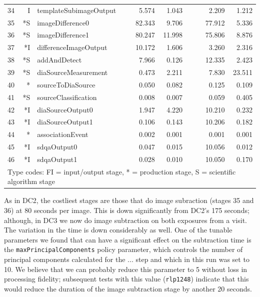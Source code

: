 \begin{table}[htbp]
\begin{center}
\begin{tabular}{lrlcrrc|crr}
34 &  I &        templateSubimageOutput &&  5.574 &  1.043 &&&  2.209 &  1.212 \\
35 & *S &              imageDifference0 && 82.343 &  9.706 &&& 77.912 &  5.336 \\  %
36 & *S &              imageDifference1 && 80.247 & 11.998 &&& 75.806 &  8.876 \\  %
37 & *I &         differenceImageOutput && 10.172 &  1.606 &&&  3.260 &  2.316 \\
38 & *S &                  addAndDetect &&  7.966 &  0.126 &&& 12.335 &  2.423 \\  %
39 & *S &          diaSourceMeasurement &&  0.473 &  2.211 &&&  7.830 & 23.511 \\  %
40 & *  &             sourceToDiaSource &&  0.050 &  0.082 &&&  0.125 &  0.109 \\
41 & *S &          sourceClassification &&  0.008 &  0.007 &&&  0.059 &  0.405 \\  %
42 & *I &              diaSourceOutput0 &&  1.947 &  4.220 &&& 10.210 &  0.232 \\
43 & *I &              diaSourceOutput1 &&  0.106 &  0.143 &&& 10.206 &  0.182 \\
44 & *  &              associationEvent &&  0.002 &  0.001 &&&  0.001 &  0.001 \\
45 & *I &                   sdqaOutput0 &&  0.047 &  0.015 &&& 10.056 &  0.012 \\
46 & *I &                   sdqaOutput1 &&  0.028 &  0.010 &&& 10.050 &  0.170 \\
\hline
\multicolumn{10}{l}{Type codes: FI = input/output stage, * = production stage,
S = scientific algorithm stage} \\
\end{tabular}
\end{center}
\end{table}

As in DC2, the costliest stages are those that do image subraction
(stages 35 and 36) at 80 seconds per image.  This is down
significantly from DC2's 175 seconds; although, in DC3 we now do image
subtraction on both exposures from a visit.  The variation in the time
is down considerably as well.  One of the tunable parameters we found
that can have a significant effect on the subtraction time is the 
{\tt maxPrincipalComponents} policy parameter, which controls the number
of principal components calculated for the ... step and which in this
run was set to 10.  We believe that we can probably reduce this
parameter to 5 without loss in processing fidelity; subsequent tests
with this value ({\tt rlp1248}) indicate that this would reduce the
duration of the image subtraction stage by another 20 seconds.

